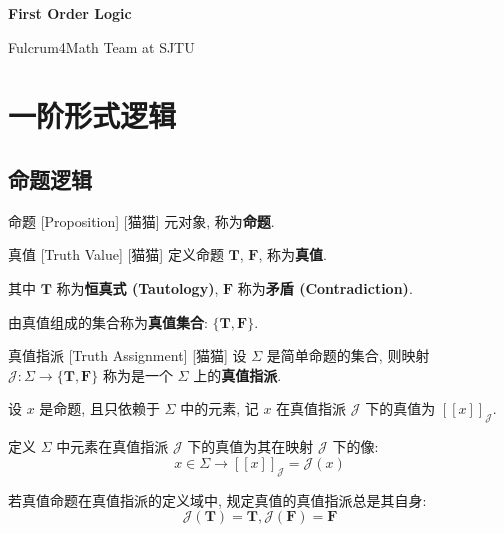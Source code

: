 \documentclass[UTF8]{ctexart}
\newcommand{\LT}{\ensuremath{\mathbf{T}}}
\newcommand{\LF}{\ensuremath{\mathbf{F}}}
\newcommand{\assign}[2]{\ensuremath{{[\![#1]\!]}_{#2}}}
\begin{document}
    \begin{center}
        {\LARGE\textbf{First Order Logic}}

        Fulcrum4Math Team at SJTU
    \end{center}

    \section{一阶形式逻辑}

        \subsection{命题逻辑}

            \begin{dfn}
                []
                {命题}
                [Proposition]
                [猫猫]
                元对象, 称为\textbf{命题}. 
            \end{dfn}

            \begin{dfn}
                []
                {真值}
                [Truth Value]
                [猫猫]
                定义命题 \(\LT\), \(\LF\), 称为\textbf{真值}. 

                其中 \(\LT\) 称为\textbf{恒真式 (Tautology)}, \(\LF\) 称为\textbf{矛盾 (Contradiction)}. 

                由真值组成的集合称为\textbf{真值集合}: \(\{\LT,\LF\}\). 
            \end{dfn}

            \begin{dfn}
                []
                {真值指派}
                [Truth Assignment]
                [猫猫]
                设 \(\Sigma\) 是简单命题的集合, 则映射 \(\mathcal{J}:\Sigma\to\{\LT,\LF\}\) 称为是一个 \(\Sigma\) 上的\textbf{真值指派}. 

                设 \(x\) 是命题, 且只依赖于 \(\Sigma\) 中的元素, 记 \(x\) 在真值指派 \(\mathcal{J}\) 下的真值为 \(\assign{x}{\mathcal{J}}\). 

                定义 \(\Sigma\) 中元素在真值指派 \(\mathcal{J}\) 下的真值为其在映射 \(\mathcal{J}\) 下的像: 
                \[x\in\Sigma\to\assign{x}{\mathcal{J}}=\mathcal{J}(x)\]
                
                若真值命题在真值指派的定义域中, 规定真值的真值指派总是其自身: 
                \[\mathcal{J}(\LT)=\LT, \mathcal{J}(\LF)=\LF\]
            \end{dfn}
\end{document}
